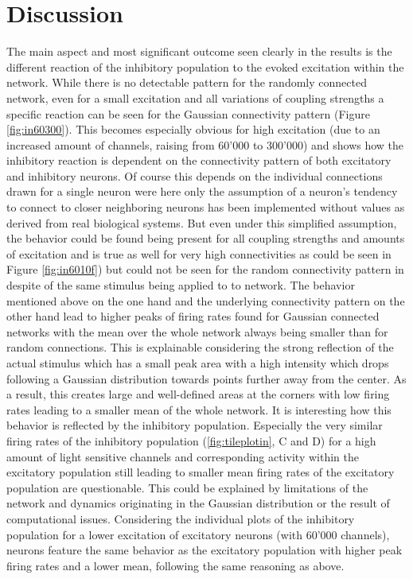 \documentclass[14pt]{SelfArx} %
\numberwithin{equation}{section}
\begin{document}
\section{Discussion}
The main aspect and most significant outcome seen clearly in the results is the different reaction of the inhibitory population to the evoked excitation within the network. While there is no detectable pattern for the randomly connected network, even for a small excitation and all variations of coupling strengths a specific reaction can be seen for the Gaussian connectivity pattern (Figure \ref{fig:in60300}). This becomes especially obvious for high excitation (due to an increased amount of channels, raising from 60'000 to 300'000) and shows how the inhibitory reaction is dependent on the connectivity pattern of both excitatory and inhibitory neurons.  \newline
Of course this depends on the individual connections drawn for a single neuron were here only the assumption of a neuron's tendency to connect to closer neighboring neurons has been implemented without values as derived from real biological systems. But even under this simplified assumption, the behavior could be found being present for all coupling strengths and amounts of excitation and is true as well for very high connectivities as could be seen in Figure \ref{fig:in6010f}) but could not be seen for the random connectivity pattern in despite of the same stimulus being applied to to network.\newline
\newline
The behavior mentioned above on the one hand and the underlying connectivity pattern on the other hand lead to higher peaks of firing rates found for Gaussian connected networks with the mean over the whole network always being smaller than for random connections. This is explainable considering the strong reflection of the actual stimulus which has a small peak area with a high intensity which drops following a Gaussian distribution towards points further away from the center. As a result, this creates large and well-defined areas at the corners with low firing rates leading to a smaller mean of the whole network. It is interesting how this behavior is reflected by the inhibitory population. Especially the very similar firing rates of the inhibitory population (\ref{fig:tileplotin}, C and D) for a high amount of light sensitive channels and corresponding activity within the excitatory population still leading to smaller mean firing rates of the excitatory population are questionable. This could be explained by limitations of the network and dynamics originating in the Gaussian distribution or the result of computational issues. Considering the individual plots of the inhibitory population for a lower excitation of excitatory neurons (with 60'000 channels), neurons feature the same behavior as the excitatory population with higher peak firing rates and a lower mean, following the same reasoning as above. \newline
\end{document}
